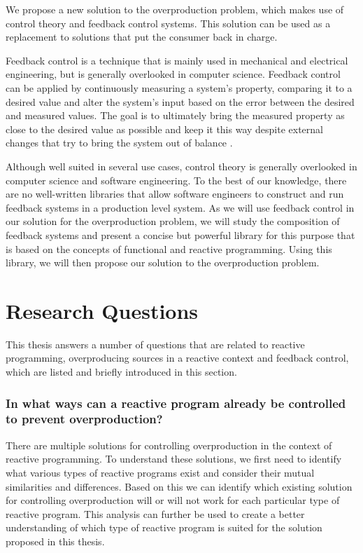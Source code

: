 We propose a new solution to the overproduction problem, which makes use of control theory and feedback control systems. This solution can be used as a replacement to solutions that put the consumer back in charge.

Feedback control is a technique that is mainly used in mechanical and electrical engineering, but is generally overlooked in computer science. Feedback control can be applied by continuously measuring a system's property, comparing it to a desired value and alter the system's input based on the error between the desired and measured values. The goal is to ultimately bring the measured property as close to the desired value as possible and keep it this way despite external changes that try to bring the system out of balance \cite{janert2013-feedback}.

Although well suited in several use cases, control theory is generally overlooked in computer science and software engineering. To the best of our knowledge, there are no well-written libraries that allow software engineers to construct and run feedback systems in a production level system. As we will use feedback control in our solution for the overproduction problem, we will study the composition of feedback systems and present a concise but powerful library for this purpose that is based on the concepts of functional and reactive programming. Using this library, we will then propose our solution to the overproduction problem.

\section*{Research Questions}
This thesis answers a number of questions that are related to reactive programming, overproducing sources in a reactive context and feedback control, which are listed and briefly introduced in this section.

\subsubsection*{In what ways can a reactive program already be controlled to prevent overproduction?}
There are multiple solutions for controlling overproduction in the context of reactive programming. To understand these solutions, we first need to identify what various types of reactive programs exist and consider their mutual similarities and differences. Based on this we can identify which existing solution for controlling overproduction will or will not work for each particular type of reactive program. This analysis can further be used to create a better understanding of which type of reactive program is suited for the solution proposed in this thesis.


